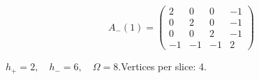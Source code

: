 \begin{minipage}{\linewidth}
\begin{minipage}[c]{0.495\linewidth}
\end{minipage}%
\begin{minipage}[c]{0.495\linewidth}\centering\fontsize{9.7}{12}\selectfont
\setlength{\abovedisplayskip}{4pt}\setlength{\belowdisplayskip}{4pt}
\setlength{\abovedisplayshortskip}{4pt}\setlength{\belowdisplayshortskip}{4pt}
\setlength{\arraycolsep}{3pt}\renewcommand{\arraystretch}{1.08}
\[A_{-}(1)=\begin{pmatrix}2 & 0 & 0 & -1\\0 & 2 & 0 & -1\\0 & 0 & 2 & -1\\-1 & -1 & -1 & 2\end{pmatrix}\]
\end{minipage}%
\par\smallskip\noindent\small $h_+=2,\quad h_-=6,\quad \Omega=8.$\quad Vertices per slice: 4.
\end{minipage}\par\vfill
